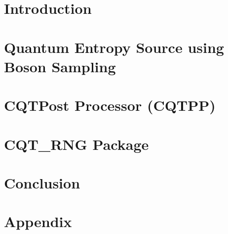 \documentclass[12pt,oneside,letterpaper]{report}
\begin{document}
\chapter{Introduction} \label{ch1}



\chapter{Quantum Entropy Source using Boson Sampling} \label{ch2}


\chapter{CQTPost Processor (CQTPP)}
\label{ch3}


\chapter{CQT\_RNG Package}
\label{ch4}


\chapter{Conclusion} \label{ch6}

\label{chp-conclusion}




% 
%
%
%
%



\appendix

\chapter{Appendix}
%
\end{document}
